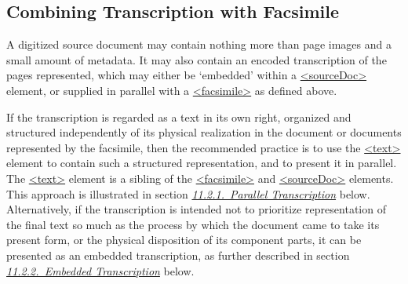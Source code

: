 \subsection[{Combining Transcription with Facsimile}]{Combining Transcription with Facsimile}\label{PH-transcr}\par
A digitized source document may contain nothing more than page images and a small amount of metadata. It may also contain an encoded transcription of the pages represented, which may either be ‘embedded’ within a \hyperref[TEI.sourceDoc]{<sourceDoc>} element, or supplied in parallel with a \hyperref[TEI.facsimile]{<facsimile>} as defined above.\par
If the transcription is regarded as a text in its own right, organized and structured independently of its physical realization in the document or documents represented by the facsimile, then the recommended practice is to use the \hyperref[TEI.text]{<text>} element to contain such a structured representation, and to present it in parallel. The \hyperref[TEI.text]{<text>} element is a sibling of the \hyperref[TEI.facsimile]{<facsimile>} and \hyperref[TEI.sourceDoc]{<sourceDoc>} elements. This approach is illustrated in section \textit{\hyperref[PH-bov]{11.2.1.\ Parallel Transcription}} below. Alternatively, if the transcription is intended not to prioritize representation of the final text so much as the process by which the document came to take its present form, or the physical disposition of its component parts, it can be presented as an embedded transcription, as further described in section \textit{\hyperref[PHZLAB]{11.2.2.\ Embedded Transcription}} below.
